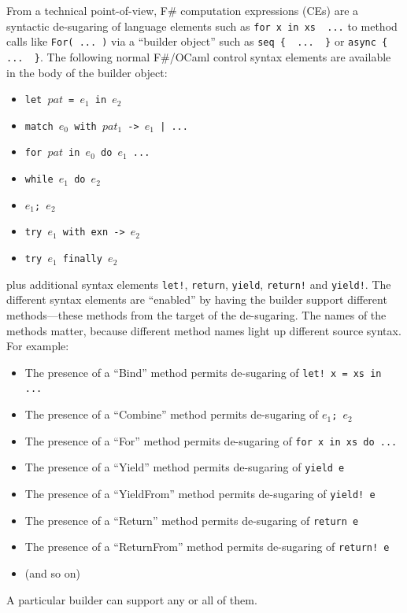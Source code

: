 \documentclass[acmsmall]{acmart}\settopmatter{}
\begin{document}
From a technical point-of-view, F\# computation expressions (CEs) are a syntactic de-sugaring of language elements
such as \verb!for x in xs  ...! to method calls like \verb!For( ... )! via a ``builder object'' such as \verb!seq {  ...  }! or \verb!async {  ...  }!. 
The following normal F\#/OCaml control syntax elements are available in the body of the builder object:
\begin{itemize}
\item \texttt{let $pat$ = $e_1$ in $e_2$}
\item \texttt{match $e_0$ with $pat_1$ -> $e_1$ | ...}
\item \texttt{for $pat$ in $e_0$ do  $e_1$ ... }
\item \texttt{while $e_1$ do  $e_2$ }
\item \texttt{$e_1$; $e_2$}
\item \texttt{try $e_1$ with exn -> $e_2$}
\item \texttt{try $e_1$ finally $e_2$}
\end{itemize}
plus additional syntax elements \texttt{let!}, \texttt{return}, \texttt{yield}, \texttt{return!} and \texttt{yield!}.
The different syntax elements are ``enabled'' by having the builder support different
methods---these methods from the target of the de-sugaring. The names of the methods matter, because different method
names light up different source syntax. For example:
\begin{itemize}
\item The presence of a ``Bind'' method permits de-sugaring of \texttt{let! x = xs in  ... }
\item The presence of a ``Combine'' method permits de-sugaring of \texttt{$e_1$; $e_2$}
\item The presence of a ``For'' method permits de-sugaring of \texttt{for x in xs do  ...}
\item The presence of a ``Yield'' method permits de-sugaring of \texttt{yield e}
\item The presence of a ``YieldFrom'' method permits de-sugaring of \texttt{yield! e}
\item The presence of a ``Return'' method permits de-sugaring of \texttt{return e}
\item The presence of a ``ReturnFrom'' method permits de-sugaring of \texttt{return! e}
\item (and so on)
\end{itemize}
A particular builder can support any or all of them.
\end{document}
